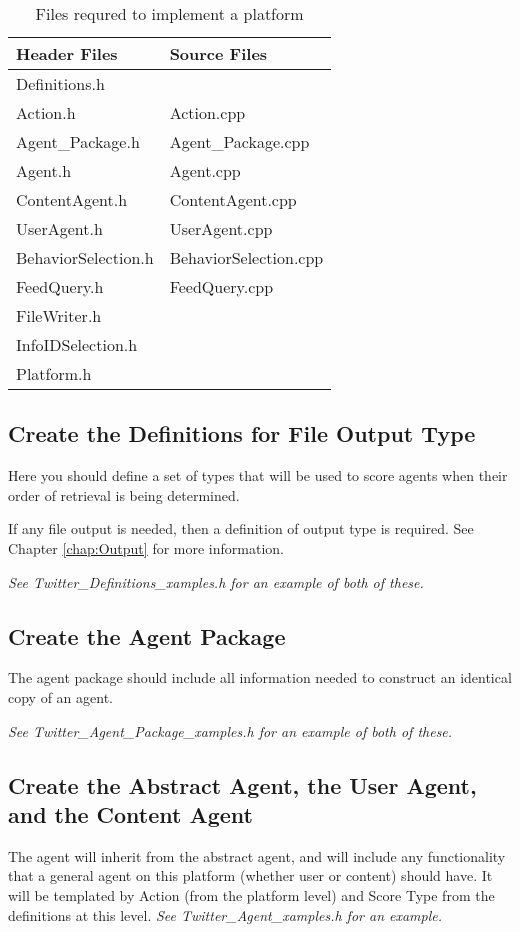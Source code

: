 \begin{table}
\label{table:ImplementationRequiredFiles}
\begin{center}
\caption{Files requred to implement a platform }
\begin{tabular}{l | l}
\hline
 Header Files & Source Files \\
\hline
 Definitions.h & \\
 Action.h & Action.cpp \\
 Agent\_Package.h & Agent\_Package.cpp \\
 Agent.h & Agent.cpp \\
 ContentAgent.h & ContentAgent.cpp\\
 UserAgent.h & UserAgent.cpp\\
 BehaviorSelection.h & BehaviorSelection.cpp\\
 FeedQuery.h & FeedQuery.cpp \\
 FileWriter.h & \\
 InfoIDSelection.h & \\
 Platform.h & \\
\end{tabular}
\end{center}
\end{table}



\subsection{Create the Definitions for File Output Type}
Here you should define a set of types that will be used to score agents when their order of retrieval is being determined.

If any file output is needed, then a definition of output type is required. See Chapter \ref{chap:Output} for more information. 

\textit{See Twitter\_Definitions\_xamples.h for an example of both of these.}

\subsection{Create the Agent Package}
The agent package should include all information needed to construct an identical copy of an agent.

\textit{See Twitter\_Agent\_Package\_xamples.h for an example of both of these.}

\subsection{Create the Abstract Agent, the User Agent, and the Content Agent}
The agent will inherit from the abstract agent, and will include any functionality that a general agent on this platform (whether user or content) should have. It will be templated by Action (from the platform level) and Score Type from the definitions at this level. \textit{See Twitter\_Agent\_xamples.h for an example.}

